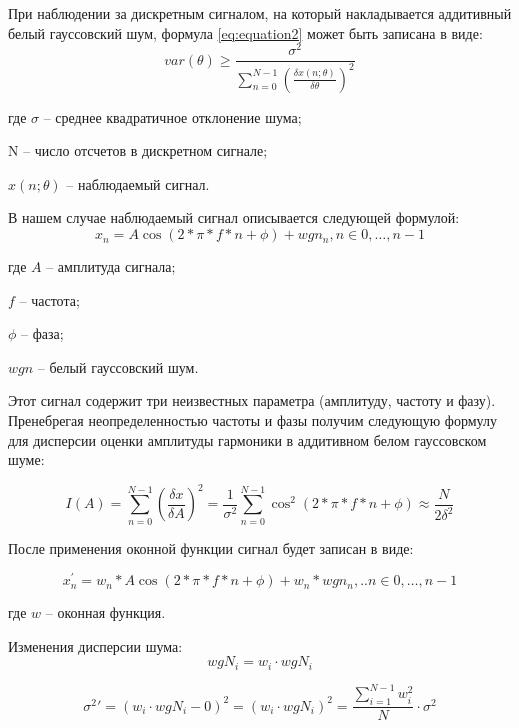 При наблюдении за дискретным сигналом, на который накладывается аддитивный белый гауссовский шум, формула \ref{eq:equation2} может быть записана в виде: 
\begin{equation}
	\label{eq:equation8}
	var(\theta)\geq\frac{\sigma^2}{\sum_{n=0}^{N-1}\left(\frac{\delta x(n;\theta)}{\delta\theta}\right)^2}
\end{equation}

где $\sigma $ -- среднее квадратичное отклонение шума;

N -- число отсчетов в дискретном сигнале;

$x(n;\theta)$ -- наблюдаемый сигнал.

В нашем случае наблюдаемый сигнал описывается следующей формулой:
\begin{equation}
	\label{eq:equation9}
	x_n=A\cos(2*\pi*f*n+\phi)+wgn_n, n\in0,…,n-1
\end{equation}

где $A$ -- амплитуда сигнала;

$f$ -- частота;

$\phi$ -- фаза;

$wgn$ -- белый гауссовский шум.

Этот сигнал содержит три неизвестных параметра (амплитуду, частоту и фазу). Пренебрегая неопределенностью частоты и фазы получим следующую формулу для дисперсии оценки амплитуды гармоники в аддитивном белом гауссовском шуме: 

\begin{equation}
	\label{eq:equation10}
	I(A)=\sum_{n=0}^{N-1}\left( \frac{\delta x}{\delta A} \right)^2 =\frac{1}{\sigma^2} \sum_{n=0}^{N-1}\cos^2 (2*\pi*f*n+\phi)\approx \frac{N}{2\delta ^2 }
\end{equation}

После применения оконной функции сигнал будет записан в виде: 

\begin{equation}
	\label{eq:equation11}
	x_n^{'}= w_n*A\cos(2*\pi*f*n+\phi)+w_n*wgn_n,..n\in 0,…,n-1
\end{equation}

где $w$ -- оконная функция.

Изменения дисперсии шума:
\begin{equation}
\label{eq:equation12}
w g N_i = w_i \cdot w g N_i
\end{equation}

\begin{equation}
	\label{eq:equation13}
{\sigma^2}' = (w_i \cdot w g N_i - 0)^2=(w_i \cdot w g N_i)^2 =\frac{\displaystyle\sum_{i=1}^{N-1} w_i^2}{N} \cdot \sigma^2
\end{equation}


